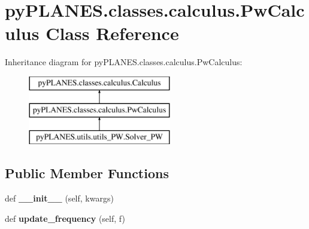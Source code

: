 \hypertarget{classpy_p_l_a_n_e_s_1_1classes_1_1calculus_1_1_pw_calculus}{}\section{py\+P\+L\+A\+N\+E\+S.\+classes.\+calculus.\+Pw\+Calculus Class Reference}
\label{classpy_p_l_a_n_e_s_1_1classes_1_1calculus_1_1_pw_calculus}
Inheritance diagram for py\+P\+L\+A\+N\+E\+S.\+classes.\+calculus.\+Pw\+Calculus\+:\begin{figure}[H]
\begin{center}
\leavevmode
\includegraphics[height=3.000000cm]{classpy_p_l_a_n_e_s_1_1classes_1_1calculus_1_1_pw_calculus}
\end{center}
\end{figure}
\subsection*{Public Member Functions}
\begin{DoxyCompactItemize}
\item 
\mbox{\label{classpy_p_l_a_n_e_s_1_1classes_1_1calculus_1_1_pw_calculus_a0adc73dcef5c022fb3b495e7e91850e0}} 
def {\bfseries \+\_\+\+\_\+init\+\_\+\+\_\+} (self, kwargs)
\item 
\mbox{\label{classpy_p_l_a_n_e_s_1_1classes_1_1calculus_1_1_pw_calculus_aefd14502b425dc36ec8395d71eff2343}} 
def {\bfseries update\+\_\+frequency} (self, f)
\end{DoxyCompactItemize}
